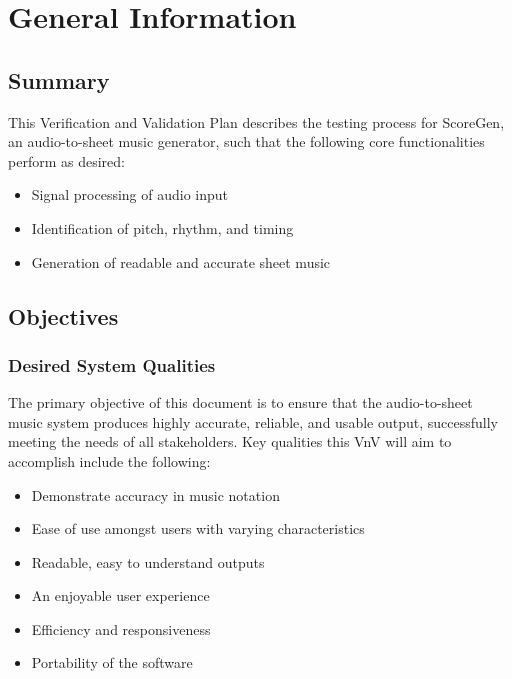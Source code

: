 \documentclass[12pt, titlepage]{article}
\begin{document}
\section{General Information}

\subsection{Summary}

This Verification and Validation Plan describes the testing process for ScoreGen, an 
audio-to-sheet music generator, such that the following core functionalities perform as desired:
\begin{itemize}
  \item Signal processing of audio input
  \item Identification of pitch, rhythm, and timing
  \item Generation of readable and accurate sheet music
\end{itemize}

\subsection{Objectives}

\subsubsection{Desired System Qualities}

The primary objective of this document is to ensure that the audio-to-sheet music system produces 
highly accurate, reliable, and usable output, successfully meeting the needs of all stakeholders. 
Key qualities this VnV will aim to accomplish include the following:
\begin{itemize}
  \item Demonstrate accuracy in music notation
  \item Ease of use amongst users with varying characteristics
  \item Readable, easy to understand outputs
  \item An enjoyable user experience
  \item Efficiency and responsiveness
  \item Portability of the software
\end{itemize}
\end{document}
